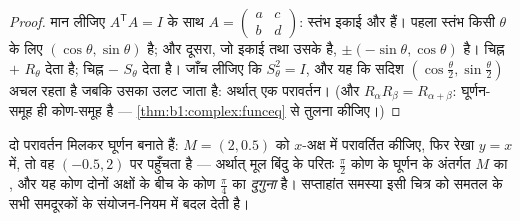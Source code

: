 \begin{proof}
मान लीजिए $A^{\mathsf T}A = I$ के साथ $A = \begin{pmatrix} a & c\\ b &
d\end{pmatrix}$: स्तंभ इकाई और  हैं। पहला स्तंभ किसी $\theta$ के लिए
$(\cos\theta, \sin\theta)$ है; और दूसरा, जो इकाई तथा उसके  है,
$\pm(-\sin\theta, \cos\theta)$ है। चिह्न $+$ $R_\theta$ देता है; चिह्न $-$
$S_\theta$ देता है। जाँच लीजिए कि $S_\theta^2 = I$, और यह कि सदिश
$(\cos\frac\theta2, \sin\frac\theta2)$ अचल रहता है जबकि उसका  उलट जाता
है: अर्थात् एक परावर्तन। (और $R_\alpha R_\beta = R_{\alpha+\beta}$:
घूर्णन-समूह ही कोण-समूह है --- \cref{thm:b1:complex:funceq} से तुलना कीजिए।)
\end{proof}

\begin{omfigure}

{\small दो परावर्तन मिलकर घूर्णन बनाते हैं: $M = (2, 0.5)$ को $x$-अक्ष में
परावर्तित कीजिए, फिर रेखा $y = x$ में, तो वह $(-0.5, 2)$ पर पहुँचता है ---
अर्थात् मूल बिंदु के परितः $\frac\pi2$ कोण के घूर्णन के अंतर्गत $M$ का
, और यह कोण दोनों अक्षों के बीच के कोण $\frac\pi4$ का \emph{दुगुना}
है। सप्ताहांत समस्या इसी चित्र को समतल के सभी समदूरकों के संयोजन-नियम में
बदल देती है।}
\end{omfigure}

